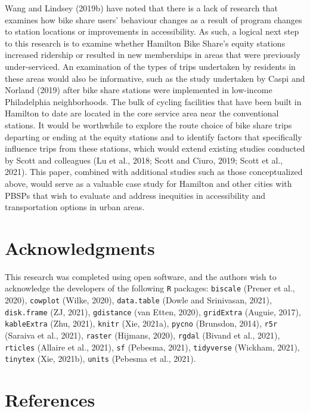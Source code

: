 \documentclass[]{elsarticle} %
\begin{document}
Wang and Lindsey (2019b) have noted that there is a lack of research
that examines how bike share users' behaviour changes as a result of
program changes to station locations or improvements in accessibility.
As such, a logical next step to this research is to examine whether
Hamilton Bike Share's equity stations increased ridership or resulted in
new memberships in areas that were previously under-serviced. An
examination of the types of trips undertaken by residents in these areas
would also be informative, such as the study undertaken by Caspi and
Norland (2019) after bike share stations were implemented in low-income
Philadelphia neighborhoods. The bulk of cycling facilities that have
been built in Hamilton to date are located in the core service area near
the conventional stations. It would be worthwhile to explore the route
choice of bike share trips departing or ending at the equity stations
and to identify factors that specifically influence trips from these
stations, which would extend existing studies conducted by Scott and
colleagues (Lu et al., 2018; Scott and Ciuro, 2019; Scott et al., 2021).
This paper, combined with additional studies such as those
conceptualized above, would serve as a valuable case study for Hamilton
and other cities with PBSPs that wish to evaluate and address inequities
in accessibility and transportation options in urban areas.

\hypertarget{acknowledgments}{%
\section{Acknowledgments}\label{acknowledgments}}

This research was completed using open software, and the authors wish to
acknowledge the developers of the following \texttt{R} packages:
\texttt{biscale} (Prener et al., 2020), \texttt{cowplot} (Wilke, 2020),
\texttt{data.table} (Dowle and Srinivasan, 2021), \texttt{disk.frame}
(ZJ, 2021), \texttt{gdistance} (van Etten, 2020), \texttt{gridExtra}
(Auguie, 2017), \texttt{kableExtra} (Zhu, 2021), \texttt{knitr} (Xie,
2021a), \texttt{pycno} (Brunsdon, 2014), \texttt{r5r} (Saraiva et al.,
2021), \texttt{raster} (Hijmans, 2020), \texttt{rgdal} (Bivand et al.,
2021), \texttt{rticles} (Allaire et al., 2021), \texttt{sf} (Pebesma,
2021), \texttt{tidyverse} (Wickham, 2021), \texttt{tinytex} (Xie,
2021b), \texttt{units} (Pebesma et al., 2021).

\hypertarget{references}{%
\section*{References}\label{references}}
\end{document}
